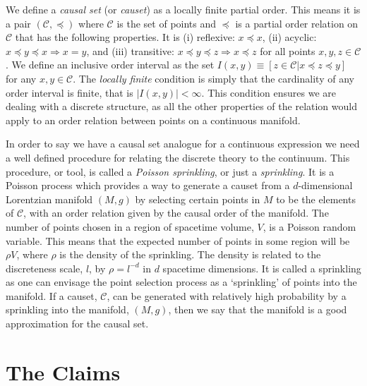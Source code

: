 \documentclass[12pt]{article}
\begin{document}
We define a \textit{causal set} (or \textit{causet}) as a locally finite partial order. This means it is a pair $ (\mathcal{C},\preceq)$ where $\mathcal{C}$ is the set of points and $\preceq$ is a partial order relation on $\mathcal{C}$ that has the following properties. It is (i) reflexive: $x\preceq x$, (ii) acyclic: $x\preceq y\preceq x \Rightarrow x=y$, and (iii) transitive: $x\preceq y\preceq z \Rightarrow x\preceq z$ for all points $x, y, z \in \mathcal{C}$. We define an inclusive order interval as the set $I (x,y)\equiv [ z\in\mathcal{C}|x\preceq z\preceq y]$ for any $x, y\in\mathcal{C}$. The \textit{locally finite} condition is simply that the cardinality of any order interval is finite, that is $|I (x,y)|<\infty$. This condition ensures we are dealing with a discrete structure, as all the other properties of the relation would apply to an order relation between points on a continuous manifold.

In order to say we have a causal set analogue for a continuous expression we need a well defined procedure for relating the discrete theory to the continuum. This procedure, or tool, is called a \textit{Poisson sprinkling}, or just a \textit{sprinkling}. It is a Poisson process which provides a way to generate a causet from a $d$-dimensional Lorentzian manifold $ (M,g)$ by selecting certain points in $M$ to be the elements of $\mathcal{C}$, with an order relation given by the causal order of the manifold. The number of points chosen in a region of spacetime volume, $V$, is a Poisson random variable. This means that the expected number of points in some region will be $\rho V$, where $\rho$ is the density of the sprinkling. The density is related to the discreteness scale, $l$, by $\rho=l^{-d}$ in $d$ spacetime dimensions. It is called a sprinkling as one can envisage the point selection process as a `sprinkling' of points into the manifold. If a causet, $\mathcal{C}$, can be generated with relatively high probability by a sprinkling into the manifold, $ (M,g)$, then we say that the manifold is a good approximation for the causal set.

\section{The Claims}
\end{document}
